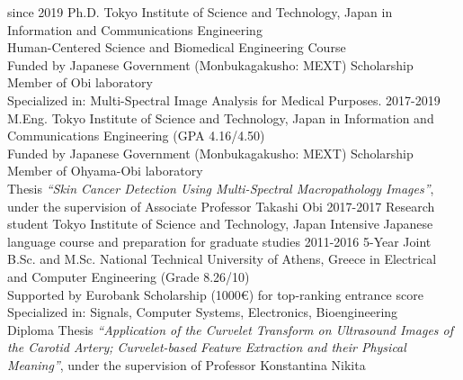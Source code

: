 \documentclass[]{friggeri-cv}
\begin{document}
\begin{entrylist}
  \entry
    {since 2019}
    {Ph.D.}
    {Tokyo Institute of Science and Technology, Japan}
    {in Information and Communications Engineering\\
    Human-Centered Science and Biomedical Engineering Course\\
    Funded by Japanese Government (Monbukagakusho: MEXT) Scholarship\\
    Member of Obi laboratory \\
    Specialized in: Multi-Spectral Image Analysis for Medical Purposes.}
  \entry
    {2017-2019}
    {M.Eng.}
    {Tokyo Institute of Science and Technology, Japan}
    {in Information and Communications Engineering (GPA 4.16/4.50)\\
    Funded by Japanese Government (Monbukagakusho: MEXT) Scholarship\\
    Member of Ohyama-Obi laboratory \\
    Thesis \emph{``Skin Cancer Detection Using Multi-Spectral Macropathology Images''}, under the supervision of Associate Professor Takashi Obi}
  \entry
    {2017-2017}
    {Research student}
    {Tokyo Institute of Science and Technology, Japan}
    {Intensive Japanese language course and preparation for graduate studies}
  \entry
    {2011-2016}
    {5-Year Joint B.Sc. and M.Sc.}
    {National Technical University of Athens, Greece}
    {in Electrical and Computer Engineering (Grade 8.26/10)\\
    Supported by Eurobank Scholarship (1000€) for top-ranking entrance score \\
    Specialized in: Signals, Computer Systems, Electronics, Bioengineering \\
    Diploma Thesis \emph{``Application of the   Curvelet Transform on Ultrasound Images of the Carotid Artery; Curvelet-based Feature Extraction and their Physical Meaning''}, under the supervision of Professor Konstantina Nikita}
\end{entrylist}
\end{document}
